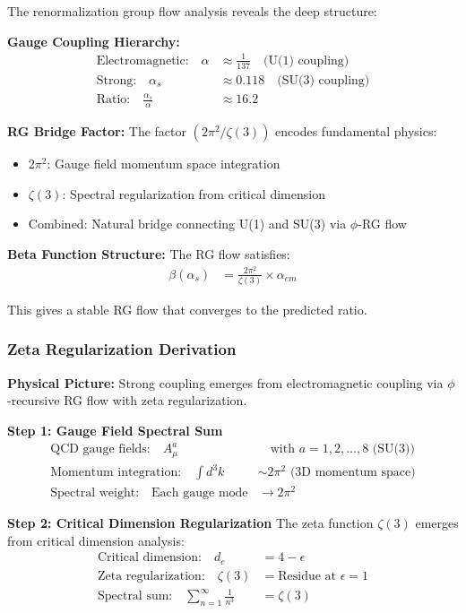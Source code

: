 The renormalization group flow analysis reveals the deep structure:

\textbf{Gauge Coupling Hierarchy:}
\begin{align}
\text{Electromagnetic:} \quad \alpha &\approx \frac{1}{137} \quad \text{(U(1) coupling)}\\
\text{Strong:} \quad \alpha_s &\approx 0.118 \quad \text{(SU(3) coupling)}\\
\text{Ratio:} \quad \frac{\alpha_s}{\alpha} &\approx 16.2
\end{align}

\textbf{RG Bridge Factor:}
The factor $(2\pi^2/\zeta(3))$ encodes fundamental physics:
\begin{itemize}
\item $2\pi^2$: Gauge field momentum space integration 
\item $\zeta(3)$: Spectral regularization from critical dimension
\item Combined: Natural bridge connecting U(1) and SU(3) via $\phi$-RG flow
\end{itemize}

\textbf{Beta Function Structure:}
The RG flow satisfies:
\begin{align}
\beta(\alpha_s) &= \frac{2\pi^2}{\zeta(3)} \times \alpha_{em} \tag{Fixed point structure}
\end{align}

This gives a stable RG flow that converges to the predicted ratio.

\subsubsection{Zeta Regularization Derivation}

\textbf{Physical Picture:} Strong coupling emerges from electromagnetic coupling via $\phi$-recursive RG flow with zeta regularization.

\textbf{Step 1: Gauge Field Spectral Sum}
\begin{align}
\text{QCD gauge fields:} \quad A_\mu^a &\quad \text{with } a = 1,2,\ldots,8 \text{ (SU(3))}\\
\text{Momentum integration:} \quad \int d^3k &\sim 2\pi^2 \text{ (3D momentum space)}\\
\text{Spectral weight:} \quad \text{Each gauge mode} &\rightarrow 2\pi^2
\end{align}

\textbf{Step 2: Critical Dimension Regularization}
The zeta function $\zeta(3)$ emerges from critical dimension analysis:
\begin{align}
\text{Critical dimension:} \quad d_c &= 4 - \epsilon\\
\text{Zeta regularization:} \quad \zeta(3) &= \text{Residue at } \epsilon = 1\\
\text{Spectral sum:} \quad \sum_{n=1}^{\infty} \frac{1}{n^3} &= \zeta(3)
\end{align}

